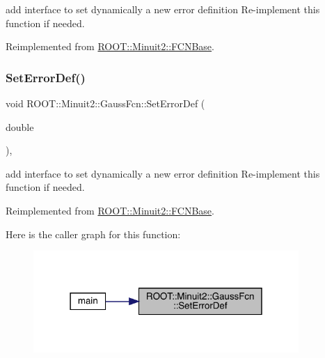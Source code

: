 add interface to set dynamically a new error definition Re-\/implement this function if needed. 

Reimplemented from \mbox{\hyperlink{classROOT_1_1Minuit2_1_1FCNBase_a840e02c2e6ef96eec289deca096b6088}{R\+O\+O\+T\+::\+Minuit2\+::\+F\+C\+N\+Base}}.

\mbox{\label{classROOT_1_1Minuit2_1_1GaussFcn_ad6ab65c15a43f72db27fd6ddf26486f9}} 
\subsubsection{\texorpdfstring{SetErrorDef()}{SetErrorDef()}\hspace{0.1cm}{\footnotesize\ttfamily [2/2]}}
{\footnotesize\ttfamily void R\+O\+O\+T\+::\+Minuit2\+::\+Gauss\+Fcn\+::\+Set\+Error\+Def (\begin{DoxyParamCaption}\item[{double}]{ }\end{DoxyParamCaption})\hspace{0.3cm}{\ttfamily [inline]}, {\ttfamily [virtual]}}

add interface to set dynamically a new error definition Re-\/implement this function if needed. 

Reimplemented from \mbox{\hyperlink{classROOT_1_1Minuit2_1_1FCNBase_a840e02c2e6ef96eec289deca096b6088}{R\+O\+O\+T\+::\+Minuit2\+::\+F\+C\+N\+Base}}.

Here is the caller graph for this function\+:
\nopagebreak
\begin{figure}[H]
\begin{center}
\leavevmode
\includegraphics[width=286pt]{de/dc1/classROOT_1_1Minuit2_1_1GaussFcn_ad6ab65c15a43f72db27fd6ddf26486f9_icgraph}
\end{center}
\end{figure}
\mbox{\label{classROOT_1_1Minuit2_1_1GaussFcn_a7e73468f853c287df3b5da240c3b5bb5}} 
